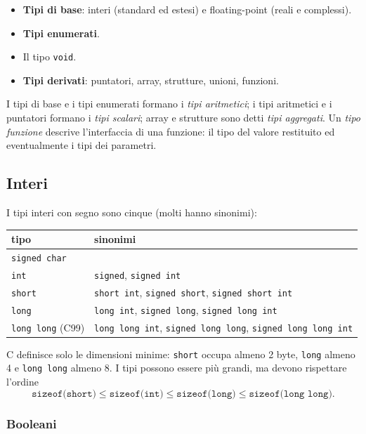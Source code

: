\documentclass[11pt,a4paper]{article}
\begin{document}
\begin{itemize}
    \item \textbf{Tipi di base}: interi (standard ed estesi) e floating-point
          (reali e complessi).
    \item \textbf{Tipi enumerati}.
    \item Il tipo \lstinline|void|.
    \item \textbf{Tipi derivati}: puntatori, array, strutture, unioni, funzioni.
\end{itemize}

I tipi di base e i tipi enumerati formano i \emph{tipi aritmetici}; i tipi
aritmetici e i puntatori formano i \emph{tipi scalari}; array e strutture sono
detti \emph{tipi aggregati}. Un \emph{tipo funzione} descrive l'interfaccia di
una funzione: il tipo del valore restituito ed eventualmente i tipi dei
parametri.

\subsection{Interi}

I tipi interi con segno sono cinque (molti hanno sinonimi):
\begin{center}
\begin{tabular}{ll}
\toprule
\textbf{tipo} & \textbf{sinonimi} \\
\midrule
\lstinline|signed char| & \\
\lstinline|int| & \lstinline|signed|, \lstinline|signed int| \\
\lstinline|short| & \lstinline|short int|, \lstinline|signed short|, \lstinline|signed short int| \\
\lstinline|long| & \lstinline|long int|, \lstinline|signed long|, \lstinline|signed long int| \\
\lstinline|long long| (C99) & \lstinline|long long int|, \lstinline|signed long long|, \lstinline|signed long long int| \\
\bottomrule
\end{tabular}
\end{center}

C definisce solo le dimensioni minime: \lstinline|short| occupa almeno 2 byte,
\lstinline|long| almeno 4 e \lstinline|long long| almeno 8. I tipi possono essere
più grandi, ma devono rispettare l'ordine
\[
  \texttt{sizeof(short)} \leq \texttt{sizeof(int)} \leq \texttt{sizeof(long)}
  \leq \texttt{sizeof(long long)} .
\]

\subsubsection{Booleani}
\end{document}

